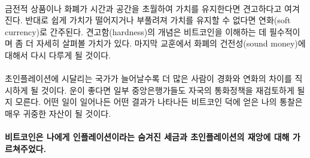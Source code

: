 \paragraph{}
금전적 상품이나 화폐가 시간과 공간을 초월하여 가치를 유지한다면 견고하다고 여겨진다. 
반대로 쉽게 가치가 떨어지거나 부풀려져 가치를 유지할 수 없다면 연화(soft currency)로 간주된다. 
견고함(hardness)의 개념은 비트코인을 이해하는 데 필수적이며 좀 더 자세히 살펴볼 가치가 있다.
마지막 교훈에서 화폐의 건전성(sound money)에 대해서 다시 다루게 될 것이다.


\paragraph{}
초인플레이션에 시달리는 국가가 늘어날수록 더 많은 사람이 경화와 연화의 차이를 직시하게 될 것이다. 
운이 좋다면 일부 중앙은행가들도 자국의 통화정책을 재검토하게 될지 모른다. 
어떤 일이 일어나든 어떤 결과가 나타나든 비트코인 덕에 얻은 나의 통찰은 매우 귀중한 자산이 될 것이다.

\paragraph{비트코인은 나에게 인플레이션이라는 숨겨진 세금과 초인플레이션의 재앙에 대해 가르쳐주었다.}

